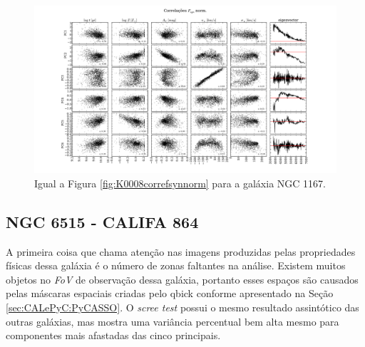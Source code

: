 \begin{figure}
    \includegraphics[width=1.3\textwidth, angle=-90]{figuras/K0119-correl-f_syn_norm-PCvsPhys.pdf}
	\caption[Correlações PCs vs. par\^ametros f\'isicos - $F_{syn}$ norm. - NGC 1167.]
	{Igual a Figura \ref{fig:K0008correfsynnorm} para a galáxia NGC 1167.}
    \label{fig:K0119correfsynnorm}
\end{figure}

\subsection{NGC 6515 - CALIFA 864}

A primeira coisa que chama atenção nas imagens produzidas pelas propriedades físicas dessa galáxia é o número de zonas
faltantes na análise. Existem muitos objetos no {\em FoV} de observação dessa galáxia, portanto esses espaços são
causados pelas máscaras espaciais criadas pelo qbick conforme apresentado na Seção \ref{sec:CALePyC:PyCASSO}. O {\em
scree test} possui o mesmo resultado assintótico das outras galáxias, mas mostra uma variância percentual bem alta mesmo
para componentes mais afastadas das cinco principais.

